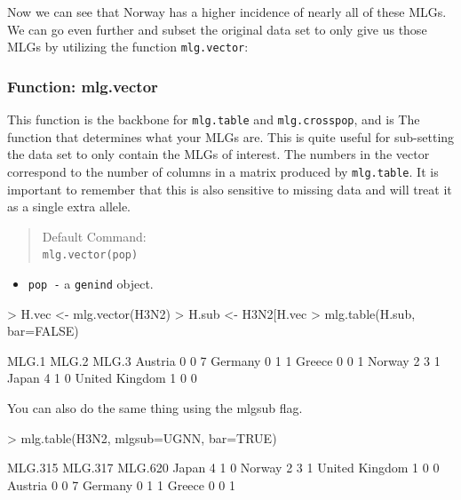 \documentclass[letterpaper]{article}
\newcommand{\tab}{\hspace*{1em}}
\begin{document}
Now we can see that Norway has a higher incidence of nearly all of these MLGs. 
We can go even further and subset the original data set to only give us those MLGs by utilizing the function \texttt{mlg.vector}:
\subsubsection{Function: mlg.vector}\label{mlg:mix:mlg.vector}

\tab\tab This function is the backbone for \texttt{mlg.table} and \texttt{mlg.crosspop}, and is The function that determines what your MLGs are. This is quite useful for sub-setting the data set to only contain the MLGs of interest. The numbers in the vector correspond to the number of columns in a matrix produced by \texttt{mlg.table}. It is important to remember that this is also sensitive to missing data and will treat it as a single extra allele. 
\begin{quote}
Default Command:\\
\texttt{mlg.vector(pop)}
\end{quote}
  \begin{itemize}
    \item \texttt{pop -} a \texttt{genind} object.
  \end{itemize}
\begin{Schunk}
\begin{Sinput}
> H.vec <- mlg.vector(H3N2)
> H.sub <- H3N2[H.vec %
> mlg.table(H.sub, bar=FALSE)
\end{Sinput}
\begin{Soutput}
               MLG.1 MLG.2 MLG.3
Austria            0     0     7
Germany            0     1     1
Greece             0     0     1
Norway             2     3     1
Japan              4     1     0
United Kingdom     1     0     0
\end{Soutput}
\end{Schunk}
You can also do the same thing using the mlgsub flag.
\begin{Schunk}
\begin{Sinput}
> mlg.table(H3N2, mlgsub=UGNN, bar=TRUE)
\end{Sinput}
\end{Schunk}
\begin{Schunk}
\begin{Soutput}
               MLG.315 MLG.317 MLG.620
Japan                4       1       0
Norway               2       3       1
United Kingdom       1       0       0
Austria              0       0       7
Germany              0       1       1
Greece               0       0       1
\end{Soutput}
\end{Schunk}
\end{document}
